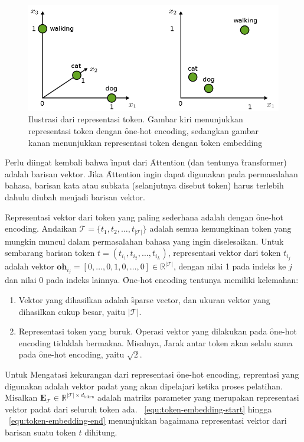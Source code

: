 	\begin{figure}
		\centering
		\includegraphics[width=1\textwidth]{assets/pics/token-embedding.png}
		\caption{Ilustrasi dari representasi token. Gambar kiri menunjukkan representasi token dengan \f{one-hot encoding}, sedangkan gambar kanan menunjukkan representasi token dengan \f{token embedding} \citep{geiger2022deeplearning}}
		\label{fig:token-embedding}
	\end{figure}

	Perlu diingat kembali bahwa \f{input} dari \f{Attention} (dan tentunya \f{transformer}) adalah barisan vektor. Jika \f{Attention} ingin dapat digunakan pada permasalahan bahasa, barisan kata atau subkata (selanjutnya disebut token) harus terlebih dahulu diubah menjadi barisan vektor.

	Representasi vektor dari token yang paling sederhana adalah dengan \f{one-hot encoding}. Andaikan $\mathcal{T} = \{t_1, t_2, \dots, t_{|\mathcal{T}|}\}$ adalah semua kemungkinan token yang mungkin muncul dalam permasalahan bahasa yang ingin diselesaikan. Untuk sembarang barisan token $t = (t_{i_1}, t_{i_2}, \dots, t_{i_L})$, representasi vektor dari token $t_{i_j}$ adalah vektor $\mathbf{oh}_{i_j} = [0, \dots, 0, 1, 0, \dots, 0] \in \mathbb{R}^{|\mathcal{T}|}$, dengan nilai 1 pada indeks ke $j$ dan nilai 0 pada indeks lainnya. \f{One-hot encoding} tentunya memiliki kelemahan:

	\begin{enumerate}
		\item Vektor yang dihasilkan adalah \f{sparse vector}, dan ukuran vektor yang dihasilkan cukup besar, yaitu $|\mathcal{T}|$.
		\item Representasi token yang buruk. Operasi vektor yang dilakukan pada \f{one-hot encoding} tidaklah bermakna. Misalnya, Jarak antar token akan selalu sama pada \f{one-hot encoding}, yaitu $\sqrt{2}$.
	\end{enumerate}

	Untuk Mengatasi kekurangan dari representasi \f{one-hot encoding}, reprentasi yang digunakan adalah vektor padat yang akan dipelajari ketika proses pelatihan. Misalkan $\mathbf{E}_{\mathcal{T}} \in \mathbb{R}^{|\mathcal{T}| \times d_{\text{token}}}$ adalah matriks parameter yang merupakan representasi vektor padat dari seluruh token ada. \equ~\ref{equ:token-embedding-start} hingga \equ~\ref{equ:token-embedding-end} menunjukkan bagaimana representasi vektor dari barisan suatu token $t$ dihitung. 

